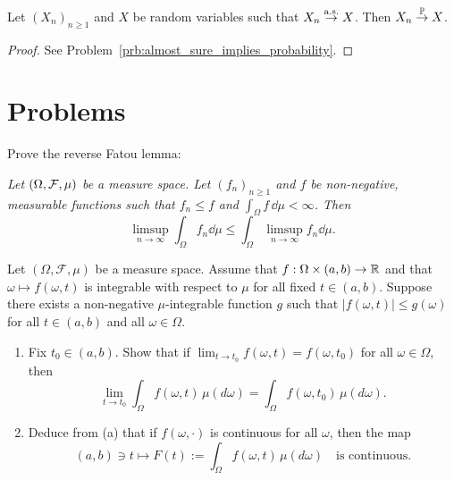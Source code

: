 \begin{lemma}\label{lem:almost_sure_implies_probability}
Let $(X_n)_{n \ge 1}$ and $X$ be random variables such that $X_n \stackrel{\mathrm{a.s.}}{\rightarrow} X$. Then $X_n \stackrel{\mathbb P}{\rightarrow} X$.
\end{lemma}

\begin{proof}
See Problem~\ref{prb:almost_sure_implies_probability}.
\end{proof}

\section{Problems}

\begin{problem}\label{prb:reverse_fatou}
Prove the reverse Fatou lemma:

\smallskip
\textit{
Let $(\Omega, \mathcal F, \mu)$ be a measure space. Let $(f_n)_{n \ge 1}$ and $f$ be non-negative, measurable functions such that $f_n \le f$ and $\int_\Omega f \, \dd \mu <\infty$. Then
\[
	\limsup_{n\to \infty} \int_\Omega f_n \dd \mu \le \int_\Omega \limsup_{n\to \infty} f_n \dd \mu.
\]
}
\end{problem}

\begin{problem}\label{pb:DCT-parametric-function}
	Let $(\Omega,\mathcal{F},\mu)$ be a measure space. Assume that $f:\Omega\times(a,b)\to\mathbb R$ and that $\omega\mapsto f(\omega,t)$ is integrable with respect to $\mu$ for all fixed $t\in(a,b)$. Suppose there exists a non-negative $\mu$-integrable function $g$ such that $|f(\omega,t)|\le g(\omega)$ for all $t\in(a,b)$ and all $\omega\in\Omega$. 
	\begin{enumerate}[label={(\alph*)}]
		\item Fix $t_0\in(a,b)$. Show that if $\lim_{t\to t_0} f(\omega,t)=f(\omega,t_0)$ for all $\omega\in\Omega$, then
		\[
			\lim_{t\to t_0}\int_\Omega f(\omega,t)\,\mu(d\omega) = \int_\Omega f(\omega,t_0)\,\mu(d\omega).
		\]
		\item Deduce from (a) that if $f(\omega,\cdot)$ is continuous for all $\omega$, then the map
		\[
			(a,b)\ni t\mapsto F(t):=\int_\Omega f(\omega,t)\,\mu(d\omega)\quad\text{is continuous.}
		\]
	\end{enumerate}
\end{problem}


